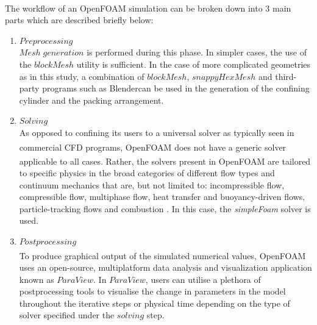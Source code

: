 The workflow of an OpenFOAM\textsuperscript{\textregistered} simulation can be broken down into 3 main parts which are described briefly below:
\begin{enumerate}
	\item $Preprocessing$
	\\$Mesh\;generation$ is performed during this phase. In simpler cases, the use of the $blockMesh$ utility is sufficient. In the case of more complicated geometries as in this study, a combination of $blockMesh$, $snappyHexMesh$ and third-party programs such as Blender\texttrademark\:can be used in the generation of the confining cylinder and the packing arrangement.
	\item $Solving$
	\\As opposed to confining its users to a universal solver as typically seen in commercial CFD programs, OpenFOAM\textsuperscript{\textregistered} does not have a generic solver applicable to all cases. Rather, the solvers present in OpenFOAM\textsuperscript{\textregistered} are tailored to specific physics in the broad categories of different flow types and continuum mechanics that are, but not limited to: incompressible flow, compressible flow, multiphase flow, heat transfer and buoyancy-driven flows, particle-tracking flows and combustion \cite{Chen2014}. In this case, the \emph{simpleFoam} solver is used.
	\item $Postprocessing$
	\\To produce graphical output of the simulated numerical values, OpenFOAM\textsuperscript{\textregistered} uses an open-source, multiplatform data analysis and visualization application known as $ParaView$. In $ParaView$, users can utilise a plethora of postprocessing tools to visualise the change in parameters in the model throughout the iterative steps or physical time depending on the type of solver specified under the $solving$ step.
\end{enumerate}
